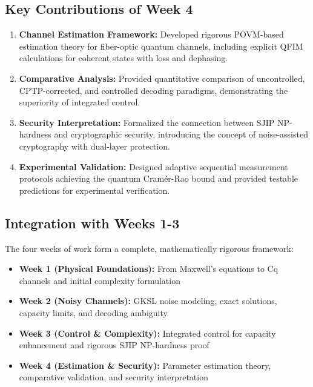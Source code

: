 \documentclass[12pt]{article}
\begin{document}
\subsection{Key Contributions of Week 4}

\begin{enumerate}
    \item \textbf{Channel Estimation Framework:} Developed rigorous POVM-based estimation theory for fiber-optic quantum channels, including explicit QFIM calculations for coherent states with loss and dephasing.
    
    \item \textbf{Comparative Analysis:} Provided quantitative comparison of uncontrolled, CPTP-corrected, and controlled decoding paradigms, demonstrating the superiority of integrated control.
    
    \item \textbf{Security Interpretation:} Formalized the connection between SJIP NP-hardness and cryptographic security, introducing the concept of noise-assisted cryptography with dual-layer protection.
    
    \item \textbf{Experimental Validation:} Designed adaptive sequential measurement protocols achieving the quantum Cram\'er-Rao bound and provided testable predictions for experimental verification.
\end{enumerate}

\subsection{Integration with Weeks 1-3}

The four weeks of work form a complete, mathematically rigorous framework:

\begin{itemize}
    \item \textbf{Week 1 (Physical Foundations):} From Maxwell's equations to Cq channels and initial complexity formulation
    \item \textbf{Week 2 (Noisy Channels):} GKSL noise modeling, exact solutions, capacity limits, and decoding ambiguity
    \item \textbf{Week 3 (Control \& Complexity):} Integrated control for capacity enhancement and rigorous SJIP NP-hardness proof
    \item \textbf{Week 4 (Estimation \& Security):} Parameter estimation theory, comparative validation, and security interpretation
\end{itemize}
\end{document}
